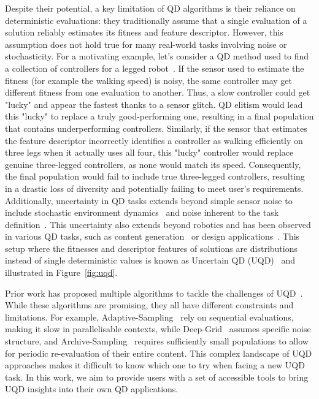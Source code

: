 Despite their potential, a key limitation of QD algorithms is their reliance on deterministic evaluations: they traditionally assume that a single evaluation of a solution reliably estimates its fitness and feature descriptor. 
However, this assumption does not hold true for many real-world tasks involving noise or stochasticity. 
For a motivating example, let's consider a QD method used to find a collection of controllers for a legged robot~\cite{nature}. If the sensor used to estimate the fitness (for example the walking speed) is noisy, the same controller may get different fitness from one evaluation to another. Thus, a slow controller could get "lucky" and appear the fastest thanks to a sensor glitch. QD elitism would lead this "lucky" to replace a truly good-performing one, resulting in a final population that contains underperforming controllers.
Similarly, if the sensor that estimates the feature descriptor incorrectly identifies a controller as walking efficiently on three legs when it actually uses all four, this "lucky" controller would replace genuine three-legged controllers, as none would match its speed. Consequently, the final population would fail to include true three-legged controllers, resulting in a drastic loss of diversity and potentially failing to meet user's requirements. 
Additionally, uncertainty in QD tasks extends beyond simple sensor noise to include stochastic environment dynamics~\cite{flageat2023uncertain, tjanaka2023training, mace2023quality, flageat2024exploring} and noise inherent to the task definition~\cite{huber2024domain, huber2024speeding}. This uncertainty also extends beyond robotics and has been observed in various QD tasks, such as content generation~\cite{earle2022illuminating} or design applications~\cite{gaier2024generative}.
This setup where the fitnesses and descriptor features of solutions are distributions instead of single deterministic values is known as Uncertain QD (UQD)~\cite{flageat2023uncertain} and illustrated in Figure~\ref{fig:uqd}.



Prior work has proposed multiple algorithms to tackle the challenges of UQD~\cite{mace2023quality, flageat2020fast, flageat2023uncertain, flageat2024exploring, grillotti2023don, adaptive}. 
While these algorithms are promising, they all have different constraints and limitations. 
For example, Adaptive-Sampling~\cite{adaptive} rely on sequential evaluations, making it slow in parallelisable contexts, while Deep-Grid~\cite{flageat2020fast} assumes specific noise structure, and Archive-Sampling~\cite{flageat2023uncertain} requires sufficiently small populations to allow for periodic re-evaluation of their entire content.
This complex landscape of UQD approaches makes it difficult to know which one to try when facing a new UQD task. 
In this work, we aim to provide users with a set of accessible tools to bring UQD insights into their own QD applications.


